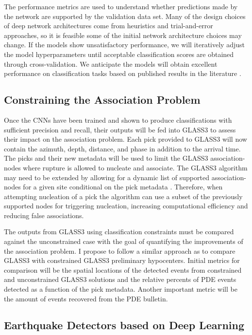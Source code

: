 \documentclass[12p]{article}
\begin{document}
The performance metrics are used to understand whether predictions made by the network are supported by the validation
data set. Many of the design choices of deep network architectures come from heuristics and trial-and-error approaches,
so it is feasible some of the initial network architecture choices may change. If the models show unsatisfactory
performance, we will iteratively adjust the model hyperparameters until acceptable classification scores are obtained
through cross-validation. We anticipate the models will obtain excellent performance on classification tasks based on
published results in the literature \citep{Perol2018, Ross2018a, Ross2018b, Zhu2019a, Zhu2019b}.

\subsection{Constraining the Association Problem}

Once the CNNs have been trained and shown to produce classifications with sufficient precision and recall, their outputs
will be fed into GLASS3 to assess their impact on the association problem. Each pick provided to GLASS3 will now contain
the azimuth, depth, distance, and phase in addition to the arrival time. The picks and their new metadata will be used
to limit the GLASS3 association-nodes where rupture is allowed to nucleate and associate. The GLASS3 algorithm may need
to be extended by allowing for a dynamic list of supported association-nodes for a given site conditional on the pick
metadata \citep{Yeck2019}. Therefore, when attempting nucleation of a pick the algorithm can use a subset of the
previously supported nodes for triggering nucleation, increasing computational efficiency and reducing false
associations.

The outputs from GLASS3 using classification constraints must be compared against the unconstrained case with the goal
of quantifying the improvements of the association problem. I propose to follow a similar approach as \citet{Yeck2019}
to compare GLASS3 with constrained GLASS3 preliminary hypocenters. Initial metrics for comparison will be the spatial
locations of the detected events from constrained and unconstrained GLASS3 solutions and the relative percents of PDE
events detected as a function of the pick metadata. Another important metric will be the amount of events recovered from
the PDE bulletin.

\subsection{Earthquake Detectors based on Deep Learning}
\end{document}
